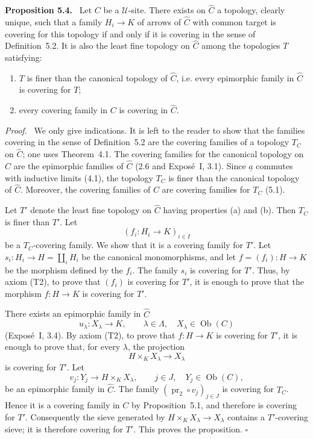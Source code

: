 \documentclass[11pt]{article}
\newcommand{\U}{\mathcal{U}}
\newcommand{\Ob}{\operatorname{Ob}}
\newcommand{\qedtext}{\hfill\(\square\)}
\newenvironment{statement}[1]{\par\medskip\noindent\textbf{#1.}\ }{\par\medskip}
\newenvironment{prooftext}{\par\noindent\emph{Proof.}\ }{\par\medskip}
\begin{document}
\begin{statement}{Proposition 5.4}
Let \(C\) be a \(\U\)-site. There exists on \(\widehat C\) a topology, clearly unique, such that a family \(H_i\to K\) of arrows of \(\widehat C\) with common target is covering for this topology if and only if it is covering in the sense of Definition~5.2. It is also the least fine topology on \(\widehat C\) among the topologies \(T\) satisfying:
\begin{enumerate}[label=\alph*)]
\item \(T\) is finer than the canonical topology of \(\widehat C\), i.e. every epimorphic family in \(\widehat C\) is covering for \(T\);
\item every covering family in \(C\) is covering in \(\widehat C\).
\end{enumerate}
\end{statement}

\begin{prooftext}
We only give indications. It is left to the reader to show that the families covering in the sense of Definition~5.2 are the covering families of a topology \(T_C\) on \(\widehat C\); one uses Theorem~4.1. The covering families for the canonical topology on \(\widehat C\) are the epimorphic families of \(\widehat C\) (2.6 and Expos\'e~I, 3.1). Since \(\underline a\) commutes with inductive limits (4.1), the topology \(T_C\) is finer than the canonical topology of \(\widehat C\). Moreover, the covering families of \(C\) are covering families for \(T_C\) (5.1).

Let \(T'\) denote the least fine topology on \(\widehat C\) having properties (a) and (b). Then \(T_C\) is finer than \(T'\). Let
\[
(f_i:H_i\to K)_{i\in I}
\]
be a \(T_C\)-covering family. We show that it is a covering family for \(T'\). Let \(s_i:H_i\to H=\coprod_iH_i\) be the canonical monomorphisms, and let \(f=(f_i):H\to K\) be the morphism defined by the \(f_i\). The family \(s_i\) is covering for \(T'\). Thus, by axiom (T2), to prove that \((f_i)\) is covering for \(T'\), it is enough to prove that the morphism \(f:H\to K\) is covering for \(T'\).

There exists an epimorphic family in \(\widehat C\)
\[
u_\lambda:X_\lambda\to K,\qquad \lambda\in\Lambda,\quad X_\lambda\in\Ob(C)
\]
(Expos\'e~I, 3.4). By axiom (T2), to prove that \(f:H\to K\) is covering for \(T'\), it is enough to prove that, for every \(\lambda\), the projection
\[
H\times_KX_\lambda\to X_\lambda
\]
is covering for \(T'\). Let
\[
v_j:Y_j\to H\times_KX_\lambda,\qquad j\in J,\quad Y_j\in\Ob(C),
\]
be an epimorphic family in \(\widehat C\). The family \((\operatorname{pr}_2\circ v_j)_{j\in J}\) is covering for \(T_C\). Hence it is a covering family in \(C\) by Proposition~5.1, and therefore is covering for \(T'\). Consequently the sieve generated by \(H\times_KX_\lambda\to X_\lambda\) contains a \(T'\)-covering sieve; it is therefore covering for \(T'\). This proves the proposition. \qedtext
\end{prooftext}
\end{document}
